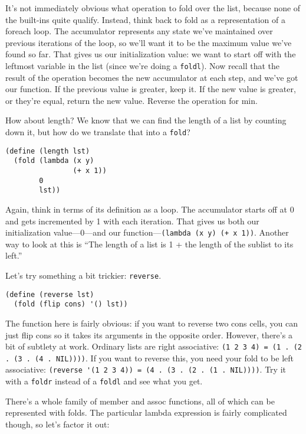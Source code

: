 It's not immediately obvious what operation to fold over the list, because none of the built-ins quite qualify. Instead, think back to fold as a representation of a foreach loop. The accumulator represents any state we've maintained over previous iterations of the loop, so we'll want it to be the maximum value we've found so far. That gives us our initialization value: we want to start off with the leftmost variable in the list (since we're doing a \verb|foldl|). Now recall that the result of the operation becomes the new accumulator at each step, and we've got our function. If the previous value is greater, keep it. If the new value is greater, or they're equal, return the new value. Reverse the operation for min.
 
How about length? We know that we can find the length of a list by counting down it, but how do we translate that into a \verb|fold|?
 
\begin{lstlisting}
(define (length lst)
  (fold (lambda (x y) 
                (+ x 1))
        0
        lst))
\end{lstlisting}
 
Again, think in terms of its definition as a loop. The accumulator starts off at 0 and gets incremented by 1 with each iteration. That gives us both our initialization value---0---and our function---\lstinline|(lambda (x y) (+ x 1))|. Another way to look at this is ``The length of a list is 1 + the length of the sublist to its left.''
 
Let's try something a bit trickier: \verb|reverse|.
 
\begin{lstlisting}
(define (reverse lst)
  (fold (flip cons) '() lst))
\end{lstlisting}
 
The function here is fairly obvious: if you want to reverse two cons cells, you can just flip cons so it takes its arguments in the opposite order. However, there's a bit of subtlety at work. Ordinary lists are right associative: \lstinline|(1 2 3 4) = (1 . (2 . (3 . (4 . NIL))))|. If you want to reverse this, you need your fold to be left associative: \lstinline|(reverse '(1 2 3 4)) = (4 . (3 . (2 . (1 . NIL))))|. Try it with a \verb|foldr| instead of a \verb|foldl| and see what you get.
 
There's a whole family of member and assoc functions, all of which can be represented with folds. The particular lambda expression is fairly complicated though, so let's factor it out:
 

